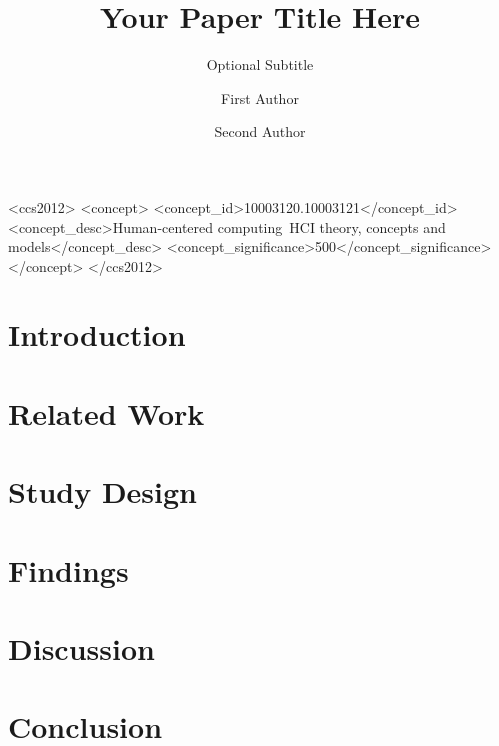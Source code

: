 \documentclass[sigconf, review]{acmart}
\begin{document}
\title{Your Paper Title Here}
\subtitle{Optional Subtitle}  %

\author{First Author}

\author{Second Author}

\begin{abstract}
  
\end{abstract}

\begin{CCSXML}
<ccs2012>
  <concept>
    <concept_id>10003120.10003121</concept_id>
    <concept_desc>Human-centered computing~HCI theory, concepts and models</concept_desc>
    <concept_significance>500</concept_significance>
  </concept>
</ccs2012>
\end{CCSXML}



\maketitle


\section{Introduction}
\label{sec:intro}


\section{Related Work}
\label{sec:related}


\section{Study Design}
\label{sec:method}


\section{Findings}
\label{sec:findings}


\section{Discussion}
\label{sec:discussion}


\section{Conclusion}
\label{sec:conclusion}





\end{document}
